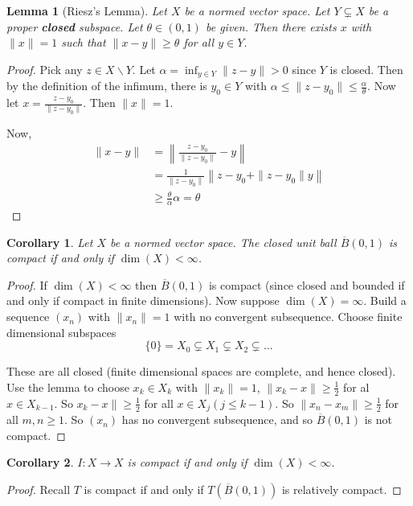 \documentclass[10pt, oneside, reqno]{amsart}
\theoremstyle{plain}%
\newtheorem{lem}[thm]{Lemma}
\newtheorem*{cor}{Corollary}
\theoremstyle{definition}
\theoremstyle{remark}
\begin{document}
\begin{lem}[Riesz's Lemma]
    Let $X$ be a normed vector space.  Let $Y \subsetneq X$ be a proper \textbf{closed} subspace.  Let $\theta \in (0, 1)$ be given. Then there exists $x$ with $\| x \| = 1$ such that $\| x - y \| \geq \theta$ for all $y \in Y$.  
\end{lem}
\begin{proof}
    Pick any $z \in X \backslash Y$.  Let $\alpha = \inf_{y \in Y} \| z - y \| > 0$ since $Y$ is closed.  Then by the definition of the infimum, there is $y_0 \in Y$ with $\alpha \leq \| z - y_0 \| \leq \frac{\alpha}{\theta}$.  Now let $x = \frac{z - y_0}{\| z - y_0 \|}$.  Then $\| x \| = 1$.  
    
    Now, \begin{align*}
        \| x - y \| &= \left \| \frac{z - y_0}{\| z - y_0 \|} - y \right \| \\
                    &= \frac{1}{\| z - y_0 \|} \left \| z - y_0 + \| z - y_0 \| y \right \| \\
                    &\geq \frac{\theta}{\alpha} \alpha = \theta
    \end{align*}
\end{proof}

\begin{cor}
    Let $X$ be a normed vector space.  The closed unit ball $\overline B(0, 1)$ is compact if and only if $\dim(X) < \infty$.  
\end{cor}
\begin{proof}
    If $\dim(X) < \infty$ then $\overline B(0, 1)$ is compact (since closed and bounded if and only if compact in finite dimensions).  Now suppose $\dim(X) = \infty$.  Build a sequence $(x_n)$ with $\| x_n \| = 1$ with no convergent subsequence.  Choose finite dimensional subspaces \[
        \{ 0 \} = X_0 \subsetneq X_1 \subsetneq X_2 \subsetneq \dots
    \]  
    
    These are all closed (finite dimensional spaces are complete, and hence closed).  Use the lemma to choose $x_k \in X_k$ with $\| x_k \| = 1$, $\| x_k - x \| \geq \frac{1}{2}$ for al $ x \in X_{k-1}$.  So $x_k - x \| \geq \frac{1}{2}$ for all $x \in X_j (j \leq k - 1)$.  So $\| x_n - x_m \| \geq \frac{1}{2}$ for all $m , n \geq 1$.  So $(x_n)$ has no convergent subsequence, and so $\overline B(0, 1)$ is not compact.  
\end{proof}
\begin{cor}
    $I : X \rightarrow X$ is compact if and only if $\dim(X) < \infty$.  
\end{cor}
\begin{proof}
    Recall $T$ is compact if and only if $T(\overline B(0, 1))$ is relatively compact.  
\end{proof}
\end{document}
